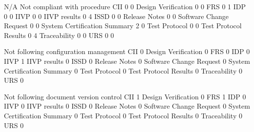 \documentclass{article}
\begin{document}
\begin{Schunk}
\begin{Soutput}
                               N/A Not compliant with procedure
  CII                            0                            0
  Design Verification            0                            0
  FRS                            0                            1
  IDP                            0                            0
  IIVP                           0                            0
  IIVP results                   0                            4
  ISSD                           0                            0
  Release Notes                  0                            0
  Software Change Request        0                            0
  System Certification Summary   2                            0
  Test Protocol                  0                            0
  Test Protocol Results          0                            4
  Traceability                   0                            0
  URS                            0                            0
                              
                               Not following configuration management
  CII                                                               0
  Design Verification                                               0
  FRS                                                               0
  IDP                                                               0
  IIVP                                                              1
  IIVP results                                                      0
  ISSD                                                              0
  Release Notes                                                     0
  Software Change Request                                           0
  System Certification Summary                                      0
  Test Protocol                                                     0
  Test Protocol Results                                             0
  Traceability                                                      0
  URS                                                               0
                              
                               Not following document version control
  CII                                                               1
  Design Verification                                               0
  FRS                                                               1
  IDP                                                               0
  IIVP                                                              0
  IIVP results                                                      0
  ISSD                                                              0
  Release Notes                                                     0
  Software Change Request                                           0
  System Certification Summary                                      0
  Test Protocol                                                     0
  Test Protocol Results                                             0
  Traceability                                                      0
  URS                                                               0
                              

\end{Soutput}
\end{Schunk}
\end{document}
